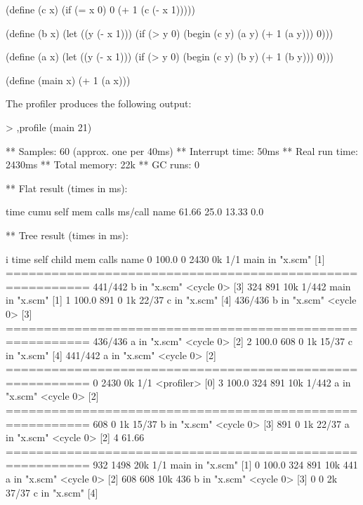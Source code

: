 \begin{example}
(define (c x)
  (if (= x 0)
      0
      (+ 1 (c (- x 1)))))

(define (b x)
  (let ((y (- x 1)))
    (if (> y 0)
        (begin
          (c y)
          (a y)
          (+ 1 (a y)))
        0)))

(define (a x)
  (let ((y (- x 1)))
    (if (> y 0)
        (begin
          (c y)
          (b y)
          (+ 1 (b y)))
        0)))

(define (main x)
  (+ 1 (a x)))
\end{example}

The profiler produces the following output:

\begin{example}
> ,profile (main 21)

** Samples:        60 (approx. one per 40ms)
** Interrupt time: 50ms
** Real run time:  2430ms
** Total memory:   22k
** GC runs:        0

** Flat result (times in ms): 

   time  cumu  self   mem  calls  ms/call  name
 61.66%
  25.0%
 13.33%
   0.0%

** Tree result (times in ms): 

i    time self child  mem    calls  name
0  100.0%
             0  2430   0k      1/1     main in "x.scm" [1]
=========================================================
                           441/442     b in "x.scm" <cycle 0> [3]
           324   891  10k    1/442     main in "x.scm" [1]
1  100.0%
           891     0   1k    22/37     c in "x.scm" [4]
                           436/436     b in "x.scm" <cycle 0> [3]
=========================================================
                           436/436     a in "x.scm" <cycle 0> [2]
2  100.0%
           608     0   1k    15/37     c in "x.scm" [4]
                           441/442     a in "x.scm" <cycle 0> [2]
=========================================================
             0  2430   0k      1/1     <profiler> [0]
3  100.0%
           324   891  10k    1/442     a in "x.scm" <cycle 0> [2]
=========================================================
           608     0   1k    15/37     b in "x.scm" <cycle 0> [3]
           891     0   1k    22/37     a in "x.scm" <cycle 0> [2]
4  61.66%
=========================================================
           932  1498  20k      1/1     main in "x.scm" [1]
0  100.0%
           324   891  10k      441     a in "x.scm" <cycle 0> [2]
           608   608  10k      436     b in "x.scm" <cycle 0> [3]
             0     0   2k    37/37     c in "x.scm" [4]

\end{example}

